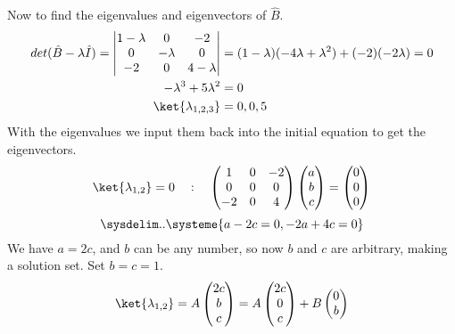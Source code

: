 \documentclass{article}
\begin{document}
\begin{enumerate}
\clearpage

		Now to find the eigenvalues and eigenvectors of $\hat{B}$.
		\begin{align*}
			det(\hat{B} - \lambda\hat{I}) = \begin{vmatrix}
				1 - \lambda & 0 & -2 \\
				0 & -\lambda & 0 \\
				-2 & 0 & 4 - \lambda
			\end{vmatrix}
			&= (1 - \lambda)(-4\lambda + \lambda^2) + (-2)(-2\lambda) = 0 \\
			-\lambda^3 + 5\lambda^2 &= 0 \\
			\ket{\lambda_{1,2,3}} &= 0,0,5
		\end{align*}
		With the eigenvalues we input them back into the initial equation to get the eigenvectors.
		\begin{align*}
			\ket{\lambda_{1,2}} = 0 \quad : \quad
			\begin{pmatrix}
				1 & 0 & -2 \\
				0 & 0 & 0 \\
				-2 & 0 & 4
			\end{pmatrix}
			\begin{pmatrix}
				a \\
				b \\
				c
			\end{pmatrix}
			= \begin{pmatrix}
				0 \\
				0 \\
				0
			\end{pmatrix}
		\end{align*}
		\begin{equation*}
			\sysdelim..\systeme{
				a - 2c = 0,
				-2a + 4c = 0
			}
		\end{equation*}
		We have $a = 2c$, and $b$ can be any number, so now $b$ and $c$ are arbitrary, making a solution set. Set $b=c=1$.
		\[
			\ket{\lambda_{1,2}} = A \begin{pmatrix}
				2c \\
				b \\
				c
			\end{pmatrix}
			= A \begin{pmatrix}
				2c \\
				0 \\
				c
			\end{pmatrix} + B \begin{pmatrix}
				0 \\
				b \\

\end{pmatrix}\]
\end{enumerate}
\end{document}
